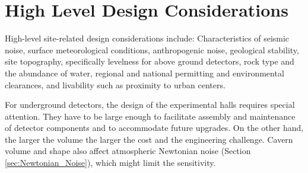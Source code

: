 \section{High Level Design Considerations}
\label{Req:Fac_Inf}
High-level site-related design considerations include: Characteristics of seismic noise, surface meteorological conditions, anthropogenic noise, geological stability, site topography, specifically levelness for above ground detectors, rock type and the abundance of water, regional and national permitting and environmental clearances, and livability such as proximity to urban centers.  


For underground detectors, the design of the experimental halls requires special attention. They have to be large enough to facilitate assembly and maintenance of detector components and to accommodate future upgrades. On the other hand, the larger the volume the larger the cost and the engineering challenge. Cavern volume and shape also affect atmospheric Newtonian noise (Section \ref{sec:Newtonian_Noise}), which might limit the sensitivity.

